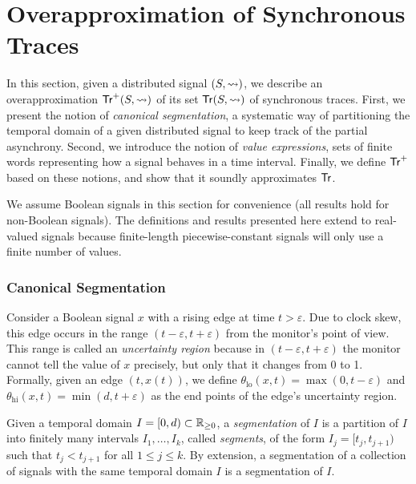 \section{Overapproximation of Synchronous Traces} \label{sec:approach}
In this section, given a distributed signal $(S,{\rightsquigarrow})$, we describe an overapproximation $\mathsf{Tr}^+(S,{\rightsquigarrow})$ of its set $\mathsf{Tr}(S,{\rightsquigarrow})$ of synchronous traces.
First, we present the notion of \emph{canonical segmentation}, a systematic way of partitioning the temporal domain of a given distributed signal to keep track of the partial asynchrony.
Second, we introduce the notion of \emph{value expressions}, sets of finite words representing how a signal behaves in a time interval.
Finally, we define $\mathsf{Tr}^+$ based on these notions, and show that it soundly approximates $\mathsf{Tr}$.

\begin{remark}
	We assume Boolean signals in this section for convenience (all results hold for non-Boolean 
	signals).
	The definitions and results presented here extend to real-valued signals because finite-length piecewise-constant signals will only use a finite number of values.
\end{remark}

\subsubsection{Canonical Segmentation}
Consider a Boolean signal $x$ with a rising edge at time $t > \varepsilon$.
Due to clock skew, this edge occurs in the range $(t - \varepsilon, t + \varepsilon)$ from the monitor's point of view.
This range is called an \emph{uncertainty region} because in $(t - \varepsilon, t + \varepsilon)$ the monitor cannot tell the value of $x$ precisely, but only that it changes from 0 to 1.
Formally, given an edge $(t, x(t))$, we define $\theta_{\text{lo}}(x,t) = \max(0, t - \varepsilon)$ and $\theta_{\text{hi}}(x,t) = \min(d, t + \varepsilon)$ as the end points of the edge's uncertainty region.

Given a temporal domain $I = [0,d) \subset \mathbb{R}_{\geq 0}$, a \emph{segmentation} of $I$ is a partition of $I$ into finitely many intervals $I_1, \ldots, I_k$, called \emph{segments}, of the form $I_j = [t_j, t_{j+1})$ such that $t_j < t_{j+1}$ for all $1 \leq j \leq k$.
By extension, a segmentation of a collection of signals with the same temporal domain $I$ is a segmentation of $I$.

